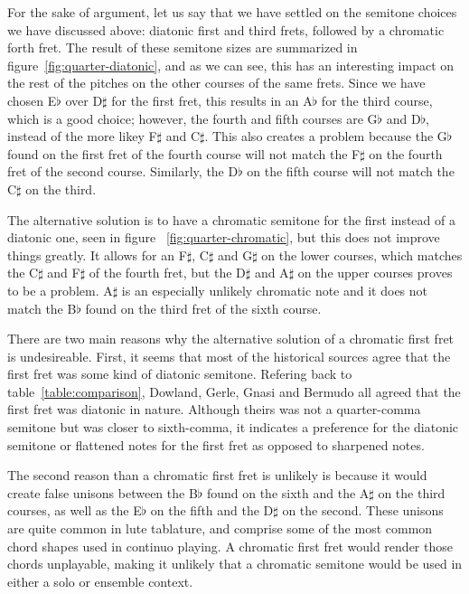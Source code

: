 For the sake of argument, let us say that we have settled on the semitone choices we have
discussed above: diatonic first and third frets, followed by a chromatic forth fret.  The
result of these semitone sizes are summarized in figure~\ref{fig:quarter-diatonic}, and as
we can see, this has an interesting impact on the rest of the pitches on the other courses
of the same frets.  Since we have chosen E$\flat$ over
D$\sharp$ for the first fret, this results in an A$\flat$ for the third course, which is a
good choice; however, the fourth and fifth courses are G$\flat$ and D$\flat$, instead of
the more likey F$\sharp$ and C$\sharp$. This also creates a problem because the G$\flat$
found on the first fret of the fourth course will not match the F$\sharp$ on the fourth
fret of the second course. Similarly, the D$\flat$ on the fifth course will not match the
C$\sharp$ on the third.

The alternative solution is to have a chromatic semitone for the first instead of a
diatonic one, seen in figure ~\ref{fig:quarter-chromatic}, but this does not improve
things greatly.  It allows for an F$\sharp$, C$\sharp$
and G$\sharp$ on the lower courses, which matches the C$\sharp$ and F$\sharp$ of the
fourth fret, but the D$\sharp$ and A$\sharp$ on the upper courses proves to be a problem.
A$\sharp$ is an especially unlikely chromatic note and it does not match the B$\flat$
found on the third fret of the sixth course.

There are two main reasons why the alternative solution of a chromatic first fret is
undesireable. First, it seems that most of the historical sources agree that the first
fret was some kind of diatonic semitone.  Refering back to table~\ref{table:comparison},
Dowland, Gerle, Gnasi and Bermudo all agreed that the first fret was diatonic in nature.
Although theirs was not a quarter-comma semitone but was closer to sixth-comma, it
indicates a preference for the diatonic semitone or flattened notes for the first fret as
opposed to sharpened notes.

The second reason than a chromatic first fret is unlikely is because it would create false
unisons between the B$\flat$ found on the sixth and the A$\sharp$ on the third courses, as
well as the E$\flat$ on the fifth and the D$\sharp$ on the second. These unisons are quite
common in lute tablature, and comprise some of the most common chord shapes used in
continuo playing.  A chromatic first fret would render those chords unplayable, making it
unlikely that a chromatic semitone would be used in either a solo or ensemble context.

